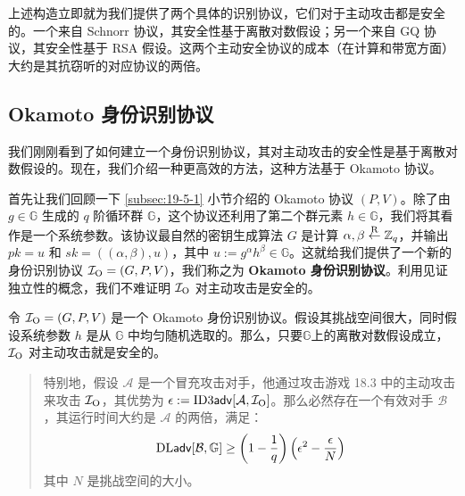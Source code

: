 \begin{snote}[具体的实例化.]
	上述构造立即就为我们提供了两个具体的识别协议，它们对于主动攻击都是安全的。一个来自 Schnorr 协议，其安全性基于离散对数假设；另一个来自 GQ 协议，其安全性基于 RSA 假设。这两个主动安全协议的成本（在计算和带宽方面）大约是其抗窃听的对应协议的两倍。
\end{snote}

\subsection{Okamoto 身份识别协议}

我们刚刚看到了如何建立一个身份识别协议，其对主动攻击的安全性是基于离散对数假设的。现在，我们介绍一种更高效的方法，这种方法基于 Okamoto 协议。

首先让我们回顾一下 \ref{subsec:19-5-1} 小节介绍的 Okamoto 协议 $(P,V)$。除了由 $g\in\mathbb{G}$ 生成的 $q$ 阶循环群 $\mathbb{G}$，这个协议还利用了第二个群元素 $h\in\mathbb{G}$，我们将其看作是一个系统参数。该协议最自然的密钥生成算法 $G$ 是计算 $\alpha,\beta\overset{\rm R}\leftarrow\mathbb{Z}_q$，并输出 $pk=u$ 和 $sk=((\alpha,\beta),u)$，其中 $u:=g^\alpha h^\beta\in\mathbb{G}$。这就给我们提供了一个新的身份识别协议 $\mathcal{I}_{\rm O}=(G,P,V)$，我们称之为 \textbf{Okamoto 身份识别协议}。利用见证独立性的概念，我们不难证明 $\mathcal{I}_{\rm O}$ 对主动攻击是安全的。

\begin{theorem}\label{theo:19-23}
令 $\mathcal{I}_{\rm O}=(G,P,V)$ 是一个 Okamoto 身份识别协议。假设其挑战空间很大，同时假设系统参数 $h$ 是从 $\mathbb{G}$ 中均匀随机选取的。那么，只要$\mathbb{G}$上的离散对数假设成立，$\mathcal{I}_{\rm O}$ 对主动攻击就是安全的。
\begin{quote}
特别地，假设 $\mathcal{A}$ 是一个冒充攻击对手，他通过攻击游戏 18.3 中的主动攻击来攻击 $\mathcal{I}_{\rm O}$，其优势为 $\epsilon:={\rm ID3\mathsf{adv}}[\mathcal{A},\mathcal{I}_{\rm O}]$。那么必然存在一个有效对手 $\mathcal{B}$，其运行时间大约是 $\mathcal{A}$ 的两倍，满足：
$$
{\rm DL\mathsf{adv}}[\mathcal{B},\mathbb{G}]\geq\left(1-\frac{1}{q}\right)\left(\epsilon^2-\frac{\epsilon}{N}\right)
$$
其中 $N$ 是挑战空间的大小。
\end{quote}
\end{theorem}

